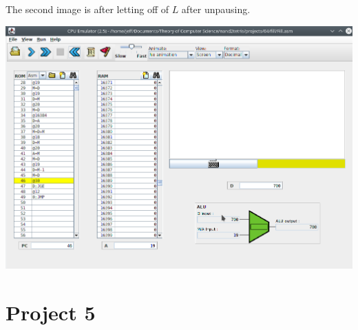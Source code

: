 \documentclass[titlepage]{article}
\begin{document}
\begin{description}
{    The second image is after letting off of $L$ after unpausing.

    \includegraphics[width=.9\textwidth]{fill-1.png}
  }
\end{description}

\section{Project 5}
\end{document}
